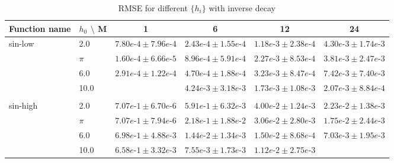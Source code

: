 \begin{table}[ht]
\caption{RMSE for different $\{h_i\}$ with inverse decay}
\label{table: sin-low with inverse decay}
\begin{center}
\begin{adjustbox}{width=\columnwidth, center}
\begin{tabular}{llllll}
\multicolumn{1}{c}{\bf Function name}&$h_0$ $\setminus$ M& \multicolumn{1}{c}{1} &\multicolumn{1}{c}{6} & \multicolumn{1}{c}{12} & \multicolumn{1}{c}{24}
\\ \hline
\multirow{4}{*}{sin-low} &2.0     & $7.80e\mbox{-}4 \pm 7.96e\mbox{-}4$   & $2.43e\mbox{-}4 \pm 1.55e\mbox{-}4$ & $1.18e\mbox{-}3 \pm 2.38e\mbox{-}4$ & $4.30e\mbox{-}3 \pm 1.74e\mbox{-}3$ \\
                         & $\pi$  & $1.60e\mbox{-}4 \pm 6.66e\mbox{-}5$   & $8.96e\mbox{-}4 \pm 5.91e\mbox{-}4$ & $2.27e\mbox{-}3 \pm 8.53e\mbox{-}4$ & $3.81e\mbox{-}3 \pm 2.47e\mbox{-}3$ \\
                         & 6.0    & $2.91e\mbox{-}4 \pm 1.22e\mbox{-}4$   & $4.70e\mbox{-}4 \pm 1.88e\mbox{-}4$ & $3.23e\mbox{-}3 \pm 8.47e\mbox{-}4$ & $7.42e\mbox{-}3 \pm 7.40e\mbox{-}3$ \\
                         & 10.0   & \color{red}{$1.49e\mbox{-}4 \pm 8.74e\mbox{-}5$}   & $4.24e\mbox{-}3 \pm 3.18e\mbox{-}3$ & $1.73e\mbox{-}3 \pm 1.08e\mbox{-}3$ & $2.07e\mbox{-}3 \pm 8.84e\mbox{-}4$ \\
\\
\multirow{4}{*}{sin-high}&2.0     & $7.07e\mbox{-}1 \pm 6.70e\mbox{-}6$  & $5.91e\mbox{-}1 \pm 6.32e\mbox{-}3$ & $4.00e\mbox{-}2 \pm 1.24e\mbox{-}3$ & $2.23e\mbox{-}2 \pm 1.38e\mbox{-}3$  \\ 
                         & $\pi$  &  $7.07e\mbox{-}1 \pm 7.94e\mbox{-}6$ & $2.18e\mbox{-}1 \pm 1.88e\mbox{-}2$ & $3.06e\mbox{-}2 \pm 2.80e\mbox{-}3$ & $1.75e\mbox{-}2 \pm 2.44e\mbox{-}3$  \\ 
                         & 6.0    & $6.98e\mbox{-}1 \pm 4.88e\mbox{-}3$  & $1.44e\mbox{-}2 \pm 1.34e\mbox{-}3$ & $1.50e\mbox{-}2 \pm 8.68e\mbox{-}4$ & $7.03e\mbox{-}3 \pm 1.95e\mbox{-}3$  \\ 
                         & 10.0   & $6.58e\mbox{-}1 \pm 3.32e\mbox{-}3$  & $7.55e\mbox{-}3 \pm 1.73e\mbox{-}3$ & $1.12e\mbox{-}2 \pm 2.75e\mbox{-}3$ & \color{red}{$4.60e\mbox{-}3 \pm 3.70e\mbox{-}4$}  \\ 
\end{tabular}
\end{adjustbox}
\end{center}
\end{table}
